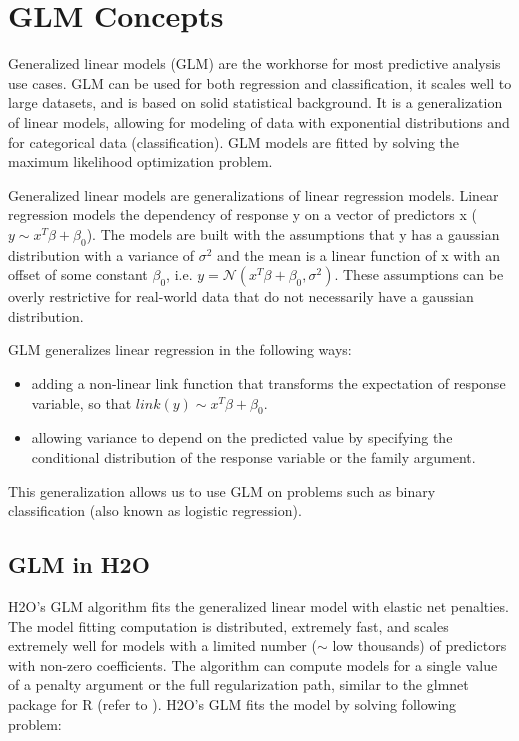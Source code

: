 \section{GLM Concepts}
Generalized linear models (GLM) are the workhorse for most predictive analysis use cases. GLM can be used for both
regression and classification, it scales well to large datasets, and is based on solid statistical background. It
is a generalization of linear models, allowing for modeling of data with exponential distributions and for
categorical data (classification). GLM models are fitted by solving the maximum likelihood optimization problem.

Generalized linear models are generalizations of linear regression models. Linear regression models the dependency
of response y on a vector of predictors x ($y \sim x^T \beta + \beta_0$). The models are built with the assumptions
that y has a gaussian distribution with a variance of $\sigma^2$ and the mean is a linear function of x with an
offset of some constant $\beta_0$, i.e. $ y = \mathcal{N}(x^T \beta + \beta_0 , \sigma^2) $. These assumptions can
be overly restrictive for real-world data that do not necessarily have a gaussian distribution.

GLM generalizes linear regression in the following ways: 

\begin{itemize} 
\item adding a non-linear link function that transforms the expectation of response variable, so that $link(y) \sim x^T \beta + \beta_0$.
\item allowing variance to depend on the predicted value by specifying the conditional distribution of the response variable or the family argument.
\end{itemize}

This generalization allows us to use GLM on problems such as binary classification (also known as logistic regression).

\subsection{GLM in H2O}
H2O's GLM algorithm fits the generalized linear model with elastic net penalties. The model fitting computation is
distributed, extremely fast, and scales extremely well for models with a limited number ($\mathtt{\sim}$ low
thousands) of predictors with non-zero coefficients. The algorithm can compute models for a single value of a
penalty argument or the full regularization path, similar to the glmnet package for R (refer
to ).  H2O's GLM fits the model by solving following problem:

